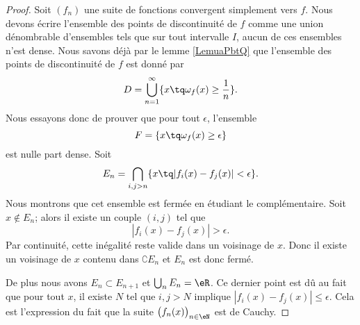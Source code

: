\begin{proof}
    Soit \( (f_n)\) une suite de fonctions convergent simplement vers \( f\). Nous devons écrire l'ensemble des points de discontinuité de \( f\) comme une union dénombrable d'ensembles tels que sur tout intervalle \( I\), aucun de ces ensembles n'est dense. Nous savons déjà par le lemme \ref{LemuaPbtQ} que l'ensemble des points de discontinuité  de \( f\) est donné par
    \begin{equation}
        D=\bigcup_{n=1}^{\infty}\{ x\tq \omega_f(x)\geq \frac{1}{  n } \}.
    \end{equation}
    Nous essayons donc de prouver que pour tout \( \epsilon\), l'ensemble 
    \begin{equation}
        F=\{ x\tq \omega_f(x)\geq \epsilon \}
    \end{equation}
    est nulle part dense. Soit
    \begin{equation}
        E_n=\bigcap_{i,j>n}\{ x\tq | f_i(x)-f_j(x) |<\epsilon \}.
    \end{equation}
    Nous montrons que cet ensemble est fermée en étudiant le complémentaire. Soit \( x\notin E_n\); alors il existe un couple \( (i,j)\) tel que
    \begin{equation}
        | f_i(x)-f_j(x) |>\epsilon.
    \end{equation}
    Par continuité, cette inégalité reste valide dans un voisinage de \( x\). Donc il existe un voisinage de \( x\) contenu dans \( \complement E_n\) et \( E_n\) est donc fermé.

    De plus nous avons \( E_n\subset E_{n+1}\) et \( \bigcup_nE_n=\eR\). Ce dernier point est dû au fait que pour tout \( x\), il existe \( N\) tel que \( i,j>N\) implique \( | f_i(x)-f_j(x) |\leq \epsilon\). Cela est l'expression du fait que la suite \( \big( f_n(x) \big)_{n\in \eN}\) est de Cauchy.


\end{proof}
